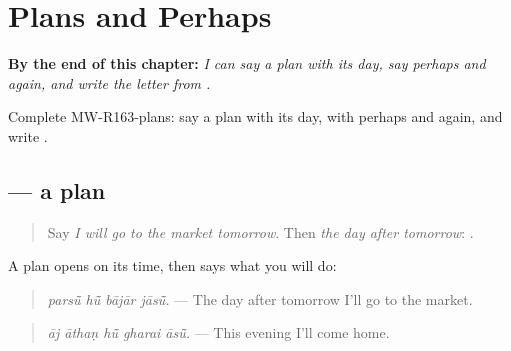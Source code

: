 
\chapter{Plans and Perhaps}
\label{ch:mw-a2-plans-and-perhaps}

\begin{chapteropening}
\textbf{By the end of this chapter:} \emph{I can say a plan with its day, say perhaps and again, and write the letter  from .}

Complete MW-R163-plans: say a plan with its day, with perhaps and again, and write .
\end{chapteropening}

\section[\texorpdfstring{\mw{परसूं} \mw{हूं} \mw{बाजार} \mw{जासूं।} (parsū̃ hū̃ bājār jāsū̃.)}{परसूं हूं बाजार जासूं। (parsū̃ hū̃ bājār jāsū̃.)}]{    — a plan}

\label{lesson:MW-C163-plan}



\begin{quote}
Say \emph{I will go to the market tomorrow}. Then \emph{the day after tomorrow}: \textbf{}.
\end{quote}

\begin{grammarlens}[title={Grammar Lens: the time first}]
A plan opens on its time, then says what you will do:

\begin{quote}
\textbf{   }
\end{quote}

\begin{quote}
\emph{parsū̃ hū̃ bājār jāsū̃.} — The day after tomorrow I'll go to the market.
\end{quote}

\begin{quote}
\textbf{    }
\end{quote}

\begin{quote}
\emph{āj āthaṇ hū̃ gharai āsū̃.} — This evening I'll come home.
\end{quote}
\end{grammarlens}

